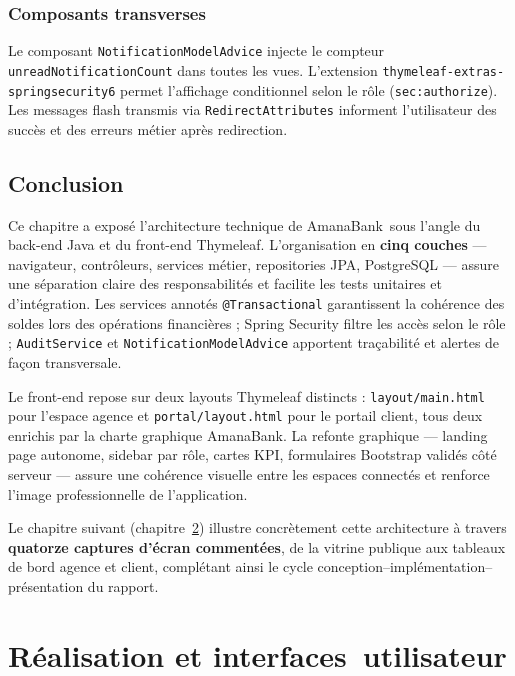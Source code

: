 \documentclass[11pt,a4paper,oneside]{report}
\newcommand{\nomapplication}{AmanaBank}
\begin{document}
\subsection{Composants transverses}

Le composant \texttt{NotificationModelAdvice} injecte le compteur \texttt{unreadNotificationCount} dans toutes les vues. L'extension \texttt{thymeleaf-extras-springsecurity6} permet l'affichage conditionnel selon le rôle (\texttt{sec:authorize}). Les messages flash transmis via \texttt{RedirectAttributes} informent l'utilisateur des succès et des erreurs métier après redirection.

\section{Conclusion}

Ce chapitre a exposé l'architecture technique de \nomapplication\ sous l'angle du back-end Java et du front-end Thymeleaf. L'organisation en \textbf{cinq couches} --- navigateur, contrôleurs, services métier, repositories JPA, PostgreSQL --- assure une séparation claire des responsabilités et facilite les tests unitaires et d'intégration. Les services annotés \texttt{@Transactional} garantissent la cohérence des soldes lors des opérations financières ; Spring Security filtre les accès selon le rôle ; \texttt{AuditService} et \texttt{NotificationModelAdvice} apportent traçabilité et alertes de façon transversale.

Le front-end repose sur deux layouts Thymeleaf distincts : \texttt{layout/main.html} pour l'espace agence et \texttt{portal/layout.html} pour le portail client, tous deux enrichis par la charte graphique AmanaBank. La refonte graphique --- landing page autonome, sidebar par rôle, cartes KPI, formulaires Bootstrap validés côté serveur --- assure une cohérence visuelle entre les espaces connectés et renforce l'image professionnelle de l'application.

Le chapitre suivant (chapitre~\ref{ch:realisation}) illustre concrètement cette architecture à travers \textbf{quatorze captures d'écran commentées}, de la vitrine publique aux tableaux de bord agence et client, complétant ainsi le cycle conception--implémentation--présentation du rapport.

\chapter{Réalisation et interfaces~utilisateur}
\label{ch:realisation}
\end{document}
